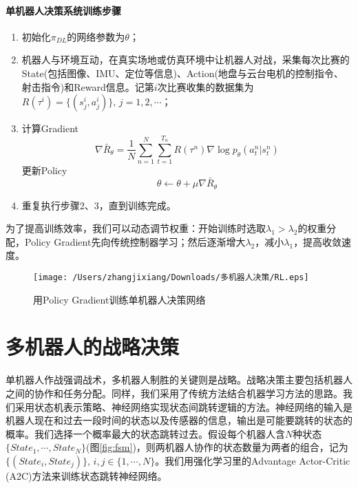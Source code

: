 \documentclass[12pt]{ctexart}
\begin{document}
\paragraph{单机器人决策系统训练步骤}
\begin{enumerate}
	\item 初始化$\pi_{DL}$的网络参数为$\theta$；
	\item 机器人与环境互动，在真实场地或仿真环境中让机器人对战，采集每次比赛的State(包括图像、IMU、定位等信息)、Action(地盘与云台电机的控制指令、射击指令)和Reward信息。记第$i$次比赛收集的数据集为$R(\tau^{i})=\{(s_{j}^i,a_{j}^i)\},\,j=1,2,\cdots$；
	\item 计算Gradient
		\begin{equation}\label{key}
		\nabla\bar{R}_{\theta} = \frac{1}{N}\sum\limits_{n = 1}^N {\sum\limits_{t = 1}^{{T_n}} {R({\tau ^n})\nabla } } \log {p_\theta }(a_t^n|s_t^n)
		\end{equation}
		更新Policy
		\begin{equation}\label{key}
		\theta  \leftarrow \theta  + \mu \nabla {\bar R_\theta }
		\end{equation}
	\item 重复执行步骤2、3，直到训练完成。
\end{enumerate}
为了提高训练效率，我们可以动态调节权重：开始训练时选取$\lambda_{1} > \lambda_{2}$的权重分配，Policy Gradient先向传统控制器学习；然后逐渐增大$\lambda_{2}$，减小$\lambda_{1}$，提高收敛速度。


\begin{figure}[tbph!]
	\centering
	\texttt{[image: /Users/zhangjixiang/Downloads/多机器人决策/RL.eps]}
	\caption{用Policy Gradient训练单机器人决策网络}
	\label{fig:rl}
\end{figure}


\section{多机器人的战略决策}
单机器人作战强调战术，多机器人制胜的关键则是战略。战略决策主要包括机器人之间的协作和任务分配。同样，我们采用了传统方法结合机器学习方法的思路。我们采用状态机表示策略、神经网络实现状态间跳转逻辑的方法。神经网络的输入是机器人现在和过去一段时间的状态以及传感器的信息，输出是可能要跳转的状态的概率。我们选择一个概率最大的状态跳转过去。假设每个机器人含$N$种状态$\{State_{1},\cdots,State_{N}\}$(图\ref{fig:fsm})，则两机器人协作的状态数量为两者的组合，记为$\{(State_{i},State_{j})\},\,i,j\in\{1,\cdots,N\}$。我们用强化学习里的Advantage Actor-Critic (A2C)方法来训练状态跳转神经网络。
\end{document}
